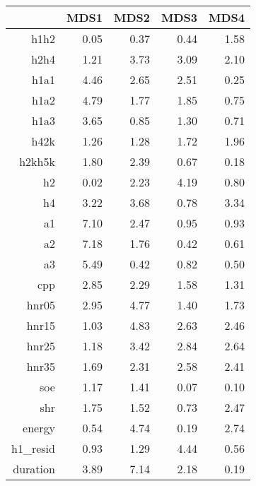 \begin{table}[ht]
\centering
\begin{tabular}{rrrrr}
  \hline
 & MDS1 & MDS2 & MDS3 & MDS4 \\ 
  \hline
h1h2 & 0.05 & 0.37 & 0.44 & 1.58 \\ 
  h2h4 & 1.21 & 3.73 & 3.09 & 2.10 \\ 
  h1a1 & 4.46 & 2.65 & 2.51 & 0.25 \\ 
  h1a2 & 4.79 & 1.77 & 1.85 & 0.75 \\ 
  h1a3 & 3.65 & 0.85 & 1.30 & 0.71 \\ 
  h42k & 1.26 & 1.28 & 1.72 & 1.96 \\ 
  h2kh5k & 1.80 & 2.39 & 0.67 & 0.18 \\ 
  h2 & 0.02 & 2.23 & 4.19 & 0.80 \\ 
  h4 & 3.22 & 3.68 & 0.78 & 3.34 \\ 
  a1 & 7.10 & 2.47 & 0.95 & 0.93 \\ 
  a2 & 7.18 & 1.76 & 0.42 & 0.61 \\ 
  a3 & 5.49 & 0.42 & 0.82 & 0.50 \\ 
  cpp & 2.85 & 2.29 & 1.58 & 1.31 \\ 
  hnr05 & 2.95 & 4.77 & 1.40 & 1.73 \\ 
  hnr15 & 1.03 & 4.83 & 2.63 & 2.46 \\ 
  hnr25 & 1.18 & 3.42 & 2.84 & 2.64 \\ 
  hnr35 & 1.69 & 2.31 & 2.58 & 2.41 \\ 
  soe & 1.17 & 1.41 & 0.07 & 0.10 \\ 
  shr & 1.75 & 1.52 & 0.73 & 2.47 \\ 
  energy & 0.54 & 4.74 & 0.19 & 2.74 \\ 
  h1\_resid & 0.93 & 1.29 & 4.44 & 0.56 \\ 
  duration & 3.89 & 7.14 & 2.18 & 0.19 \\ 
   \hline
\end{tabular}
\end{table}
